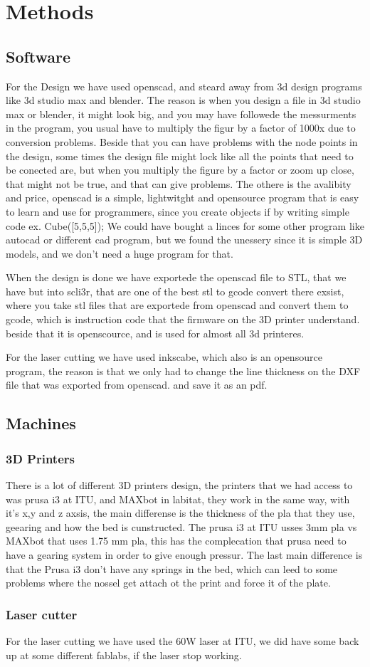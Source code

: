\section{Methods}
\subsection{Software}
For the Design we have used openscad, and steard away from 3d design programs like 3d studio max and blender.
The reason is when you design a file in 3d studio max or blender, it might look big, and you may have followede the messurments in the program, you usual have to multiply the figur by a factor of 1000x due to conversion problems. Beside that you can have problems with the node points in the design, some times the design file might lock like all the points that need to be conected are, but when you multiply the figure by a factor or zoom up close, that might not be true, and that can give problems.
The othere is the avalibity and price, openscad is a simple, lightwitght and opensource program that is easy to learn and use for programmers, since you create objects if by writing simple code ex. Cube([5,5,5]); 
We could have bought a linces for some other program like autocad or different cad program, but we found the unessery since it is simple 3D models, and we don't need a huge program for that.

When the design is done we have exportede the openscad file to STL, that we have but into scli3r, that are one of the best stl to gcode convert there exsist, where you take stl files that are exportede from openscad and convert them to gcode, which is instruction code that the firmware on the 3D printer understand. beside that it is openscource, and is used for almost all 3d printeres.

For the laser cutting we have used inkscabe, which also is an opensource program, the reason is that we only had to change the line thickness on the DXF file that was exported from openscad. and save it as an pdf. 

\subsection{Machines}
\subsubsection{3D Printers}
There is a lot of different 3D printers design, the printers that we had access to was prusa i3 at ITU, and MAXbot in labitat, they work in the same way, with it's x,y  and z axsis, the main differense is the thickness of the pla that they use, geearing and how the bed is cunstructed. The prusa i3 at ITU usses 3mm pla vs MAXbot that uses 1.75 mm pla, this has the complecation that prusa need to have a gearing system in order to give enough pressur.
The last main difference is that the Prusa i3 don't have any springs in the bed, which can leed to some problems where the nossel get attach ot the print and force it of the plate.

\subsubsection{Laser cutter}
For the laser cutting we have used the 60W laser at ITU, we did have some back up at some different fablabs, if the laser stop working.